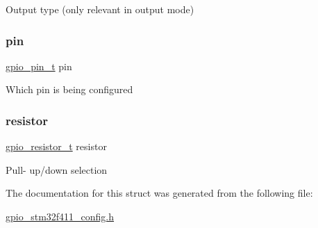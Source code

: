 Output type (only relevant in output mode) \mbox{\label{structgpio__config__t_aa83b7f8f34af30b37ce9e23e82de5352}} 
\subsubsection{\texorpdfstring{pin}{pin}}
{\footnotesize\ttfamily \hyperlink{gpio__stm32f411__config_8h_abf6d98e99fb0fb81b56c89f29bd6120e}{gpio\+\_\+pin\+\_\+t} pin}

Which pin is being configured \mbox{\label{structgpio__config__t_ab5a0dd08a2fc2af65242c91b9641e112}} 
\subsubsection{\texorpdfstring{resistor}{resistor}}
{\footnotesize\ttfamily \hyperlink{gpio__stm32f411__config_8h_ae69599cbb4f87bfc9da21f3db8b0fe3a}{gpio\+\_\+resistor\+\_\+t} resistor}

Pull-\/ up/down selection 

The documentation for this struct was generated from the following file\+:\begin{DoxyCompactItemize}
\item 
\hyperlink{gpio__stm32f411__config_8h}{gpio\+\_\+stm32f411\+\_\+config.\+h}\end{DoxyCompactItemize}
